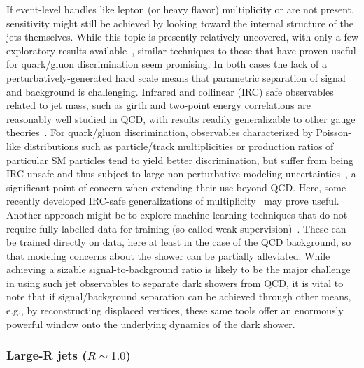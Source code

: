 If event-level handles like lepton (or heavy flavor) multiplicity or \MET are not present, sensitivity might still be achieved by looking toward the internal structure of the jets themselves. While this topic is presently relatively uncovered, with only a few exploratory results available~\cite{Park:2017rfb}, similar techniques to those that have proven useful for quark/gluon discrimination seem promising. In both cases the lack of a perturbatively-generated hard scale means that parametric separation of signal and background is challenging. Infrared and collinear (IRC) safe observables related to jet mass, such as girth and two-point energy correlations are reasonably well studied in QCD, with results readily generalizable to other gauge theories~\cite{Gallicchio:2010dq,Larkoski:2013eya,Larkoski:2014gra}. For quark/gluon discrimination, observables characterized by Poisson-like distributions such as particle/track multiplicities or production ratios of particular SM particles tend to yield better discrimination, but suffer from being IRC unsafe and thus subject to large non-perturbative modeling uncertainties~\cite{Gras:2017jty}, a significant point of concern when extending their use beyond QCD. Here, some recently developed IRC-safe generalizations of multiplicity~\cite{Frye:2017yrw} may prove useful. Another approach might be to explore machine-learning techniques that do not require fully labelled data for training (so-called weak supervision)~\cite{Dery:2017fap,Cohen:2017exh,Metodiev:2017vrx}. These can be trained directly on data, here at least in the case of the QCD background, so that modeling concerns about the shower can be partially alleviated. While achieving a sizable signal-to-background ratio is likely to be the major challenge in using such jet observables to separate dark showers from QCD, it is vital to note that if signal/background separation can be achieved through other means, e.g., by reconstructing displaced vertices, these same tools offer an enormously powerful window onto the underlying dynamics of the dark shower.

\subsubsection{Large-R jets ($R \sim 1.0$)}
\label{sec:darkshowerfatjet}

